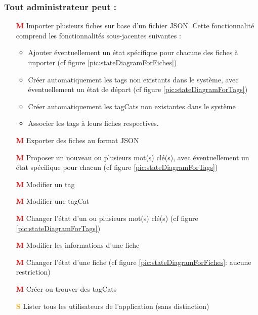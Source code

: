 \subsubsection*{Tout administrateur peut : }
\begin{itemize}
    \item[\textcolor{red}{\textbf{M}}] Importer plusieurs \glspl{fiche} sur base d'un fichier JSON.
        Cette fonctionnalité comprend les fonctionnalités sous-jacentes suivantes :
        \begin{itemize}
            \item Ajouter éventuellement un état spécifique pour chacune des \glspl{fiche} à importer (cf figure \ref{pic:stateDiagramForFiches})
            \item Créer automatiquement les \glspl{tag} non existants dans le système, avec éventuellement un état de départ (cf figure \ref{pic:stateDiagramForTags})
            \item Créer automatiquement les \glspl{tagCat} non existantes dans le système
            \item Associer les \glspl{tag} à leurs \glspl{fiche} respectives. 
        \end{itemize}
    \item[\textcolor{red}{\textbf{M}}] Exporter des \glspl{fiche} au format JSON
    \item[\textcolor{red}{\textbf{M}}] Proposer un nouveau ou plusieurs mot(s) clé(s), avec éventuellement un état spécifique pour chacun (cf figure \ref{pic:stateDiagramForTags})
    \item[\textcolor{red}{\textbf{M}}] Modifier un \gls{tag} 
    \item[\textcolor{red}{\textbf{M}}] Modifier une \gls{tagCat} 
    \item[\textcolor{red}{\textbf{M}}] Changer l'état d'un ou plusieurs mot(s) clé(s) (cf figure \ref{pic:stateDiagramForTags})
    \item[\textcolor{red}{\textbf{M}}] Modifier les informations d'une \gls{fiche} 
    \item[\textcolor{red}{\textbf{M}}] Changer l'état d'une \gls{fiche} (cf figure \ref{pic:stateDiagramForFiches}: aucune restriction)
    \item[\textcolor{red}{\textbf{M}}] Créer ou trouver des \glspl{tagCat}
    \item[\textcolor{orange}{\textbf{S}}] Lister tous les utilisateurs de l'application (sans distinction)
\end{itemize}

